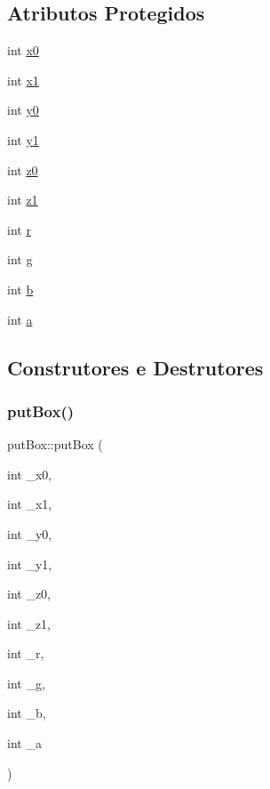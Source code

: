 \subsection*{Atributos Protegidos}
\begin{DoxyCompactItemize}
\item 
int \mbox{\hyperlink{classput_box_abcfcd0d2c106eb36967671a62ccba7dd}{x0}}
\item 
int \mbox{\hyperlink{classput_box_a08a9a72ed84275d1928b5ff46564ac69}{x1}}
\item 
int \mbox{\hyperlink{classput_box_afdc1185312c60fc09bc47b546d81dac2}{y0}}
\item 
int \mbox{\hyperlink{classput_box_aaf76b850809e592b8657067f08d76992}{y1}}
\item 
int \mbox{\hyperlink{classput_box_ab6855c25ac8539a3473f01574ce6ecd9}{z0}}
\item 
int \mbox{\hyperlink{classput_box_a9624a64ff3a3250645fe2fec478e74c9}{z1}}
\item 
int \mbox{\hyperlink{classput_box_a0baca80ed19dfa4dd1c6e8627ad789e6}{r}}
\item 
int \mbox{\hyperlink{classput_box_a4822603beb1b334019741bf3f6089c15}{g}}
\item 
int \mbox{\hyperlink{classput_box_aa0df4260b6c90280256a3717ffff72ff}{b}}
\item 
int \mbox{\hyperlink{classput_box_aa16f1f7eeba4af791a9637033c9e7041}{a}}
\end{DoxyCompactItemize}


\subsection{Construtores e Destrutores}
\mbox{\label{classput_box_a0681d6bc86d73945045d3bc8fe31ca9c}} 
\subsubsection{\texorpdfstring{putBox()}{putBox()}}
{\footnotesize\ttfamily put\+Box\+::put\+Box (\begin{DoxyParamCaption}\item[{int}]{\+\_\+x0,  }\item[{int}]{\+\_\+x1,  }\item[{int}]{\+\_\+y0,  }\item[{int}]{\+\_\+y1,  }\item[{int}]{\+\_\+z0,  }\item[{int}]{\+\_\+z1,  }\item[{int}]{\+\_\+r,  }\item[{int}]{\+\_\+g,  }\item[{int}]{\+\_\+b,  }\item[{int}]{\+\_\+a }\end{DoxyParamCaption})}


